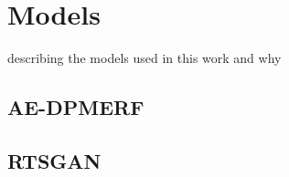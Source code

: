 \section{Models}
describing the models used in this work and why

\subsection{AE-DPMERF}

\subsection{RTSGAN}